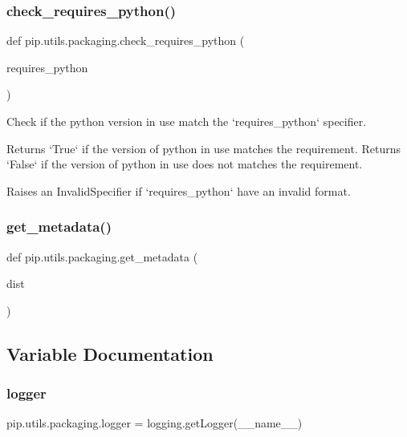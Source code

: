 \mbox{\label{namespacepip_1_1utils_1_1packaging_abd5038b57cdf200a50af2fba4c7d5806}} 
\subsubsection{\texorpdfstring{check\+\_\+requires\+\_\+python()}{check\_requires\_python()}}
{\footnotesize\ttfamily def pip.\+utils.\+packaging.\+check\+\_\+requires\+\_\+python (\begin{DoxyParamCaption}\item[{}]{requires\+\_\+python }\end{DoxyParamCaption})}

\begin{DoxyVerb}Check if the python version in use match the `requires_python` specifier.

Returns `True` if the version of python in use matches the requirement.
Returns `False` if the version of python in use does not matches the
requirement.

Raises an InvalidSpecifier if `requires_python` have an invalid format.
\end{DoxyVerb}
 \mbox{\label{namespacepip_1_1utils_1_1packaging_a3383de39c28913cb0e1bf903be4e93cc}} 
\subsubsection{\texorpdfstring{get\+\_\+metadata()}{get\_metadata()}}
{\footnotesize\ttfamily def pip.\+utils.\+packaging.\+get\+\_\+metadata (\begin{DoxyParamCaption}\item[{}]{dist }\end{DoxyParamCaption})}



\subsection{Variable Documentation}
\mbox{\label{namespacepip_1_1utils_1_1packaging_a3b65ead6832dd039e4218edef46ff791}} 
\subsubsection{\texorpdfstring{logger}{logger}}
{\footnotesize\ttfamily pip.\+utils.\+packaging.\+logger = logging.\+get\+Logger(\+\_\+\+\_\+name\+\_\+\+\_\+)}


